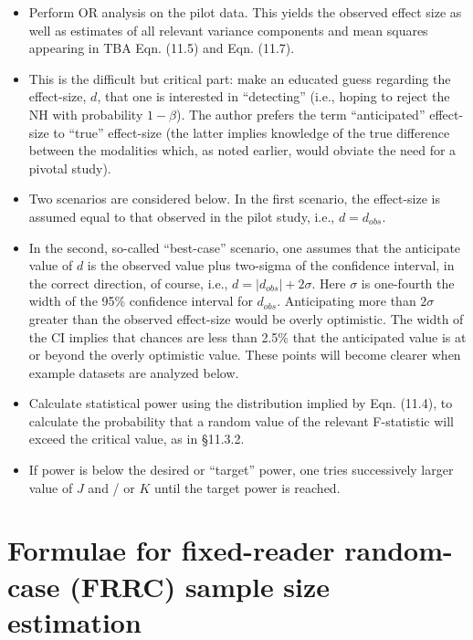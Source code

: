 \documentclass[
]{book}
\providecommand{\tightlist}{%
  \setlength{\itemsep}{0pt}\setlength{\parskip}{0pt}}
\begin{document}
\begin{itemize}
\tightlist
\item
  Perform OR analysis on the pilot data. This yields the observed effect size as well as estimates of all relevant variance components and mean squares appearing in TBA Eqn. (11.5) and Eqn. (11.7).
\item
  This is the difficult but critical part: make an educated guess regarding the effect-size, \(d\), that one is interested in ``detecting'' (i.e., hoping to reject the NH with probability \(1-\beta\)). The author prefers the term ``anticipated'' effect-size to ``true'' effect-size (the latter implies knowledge of the true difference between the modalities which, as noted earlier, would obviate the need for a pivotal study).
\item
  Two scenarios are considered below. In the first scenario, the effect-size is assumed equal to that observed in the pilot study, i.e., \(d = d_{obs}\).
\item
  In the second, so-called ``best-case'' scenario, one assumes that the anticipate value of \(d\) is the observed value plus two-sigma of the confidence interval, in the correct direction, of course, i.e., \(d=\left | d_{obs} \right |+2\sigma\). Here \(\sigma\) is one-fourth the width of the 95\% confidence interval for \(d_{obs}\). Anticipating more than \(2\sigma\) greater than the observed effect-size would be overly optimistic. The width of the CI implies that chances are less than 2.5\% that the anticipated value is at or beyond the overly optimistic value. These points will become clearer when example datasets are analyzed below.
\item
  Calculate statistical power using the distribution implied by Eqn. (11.4), to calculate the probability that a random value of the relevant F-statistic will exceed the critical value, as in §11.3.2.
\item
  If power is below the desired or ``target'' power, one tries successively larger value of \(J\) and / or \(K\) until the target power is reached.
\end{itemize}

\hypertarget{roc-sample-size-or-FRRC-sample-size-estimation}{%
\section{Formulae for fixed-reader random-case (FRRC) sample size estimation}\label{roc-sample-size-or-FRRC-sample-size-estimation}}
\end{document}
